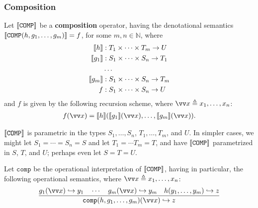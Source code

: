 \subsubsection{Composition}

\label{sec:generalised-composition}

\begin{definition} Let ${\mathopen{}\left\llbracket{\mathtt{COMP}}\right\rrbracket\mathclose{}}$ be a \textbf{composition}
operator, having the denotational semantics
${\mathopen{}\left\llbracket{\mathtt{COMP}{\ensuremath{\mathopen{}\left({h,g_1,\ldots,g_m}\right)\mathclose{}}}}\right\rrbracket\mathclose{}} = f$, for some $m,n\in \mathbb{N}$,
where \begin{align*}
%
\sem{h} & : T_1 \times \cdots \times T_m \rightarrow U \\
%
\sem{g_1} & : S_1 \times \cdots \times S_n \rightarrow T_1 \\
%
& \ldots \\
%
\sem{g_m} & : S_1 \times \cdots \times S_n \rightarrow T_m \\
%
f & : S_1 \times \cdots \times S_n \rightarrow U
%
\end{align*} and $f$ is given by the following recursion scheme, where
$\vect{x} \triangleq x_1,\ldots,x_n$:\begin{align*}
%
f\p{\vect{x}} = \sem{h}\p{\sem{g_1}\p{\vect{x}}, \ldots,
\sem{g_m}\p{\vect{x}}}.
%
\end{align*}

\end{definition}

\begin{remark} ${\mathopen{}\left\llbracket{\mathtt{COMP}}\right\rrbracket\mathclose{}}$ is parametric in the types
$S_1,\ldots,S_n$, $T_1,\ldots,T_m$, and $U$. In simpler cases, we might let
$S_1 = \cdots = S_n = S$ and let $T_1 = \cdots T_m = T$, and have
${\mathopen{}\left\llbracket{\mathtt{COMP}}\right\rrbracket\mathclose{}}$ parametrized in $S$, $T$, and $U$; perhaps even let
$S=T=U$. \end{remark}

\begin{definition} Let $\mathtt{comp}$ be the operational interpretation of
${\mathopen{}\left\llbracket{\mathtt{COMP}}\right\rrbracket\mathclose{}}$, having in particular, the following operational
semantics, where $\vect{x} \triangleq x_1, \ldots, x_n$:\begin{align*}
%
\judgement{
%
  g_1\p{\vect{x}} \goesto y_1 \quad \cdots \quad g_m\p{\vect{x}} \goesto y_m
\quad h\p{y_1,\ldots, y_m} \goesto z
%
}{
%
  \mathtt{comp}\p{h,g_1,\ldots,g_m}\p{\vect{x}} \goesto z
%
}
%
\end{align*}

\end{definition}

